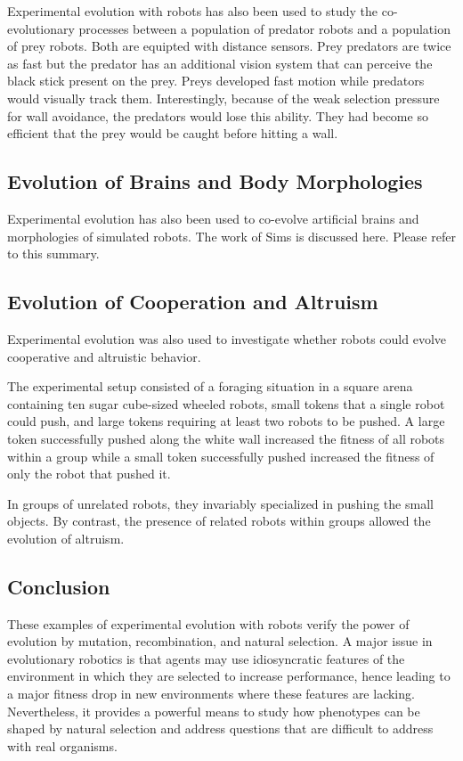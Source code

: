 \documentclass[../main.tex]{subfiles}
\begin{document}
\begin{experiment}
Experimental evolution with robots has also been used to study the co-evolutionary processes between a population of
predator robots and a population of prey robots. Both are equipted with distance sensors. Prey predators are twice as
fast but the predator has an additional vision system that can perceive the black stick present on the prey. Preys
developed fast motion while predators would visually track them. Interestingly, because of the weak selection pressure
for wall avoidance, the predators would lose this ability. They had become so efficient that the prey would be caught
before hitting a wall.
\end{experiment}

\subsection{Evolution of Brains and Body Morphologies}
Experimental evolution has also been used to co-evolve artificial brains and morphologies of simulated robots. The work of Sims \cite{Sims:1994:EMB:1667943.1667946} is discussed here. Please refer to this summary.

\subsection{Evolution of Cooperation and Altruism}
Experimental evolution was also used to investigate whether robots could evolve cooperative and altruistic behavior.

\begin{experiment}
The experimental setup consisted of a foraging situation in a square arena containing ten sugar cube-sized wheeled
robots, small tokens that a single robot could push, and large tokens requiring at least two robots to be pushed. A
large token successfully pushed along the white wall increased the fitness of all robots within a group while a small
token successfully pushed increased the fitness of only the robot that pushed it.

In groups of unrelated robots, they invariably specialized in pushing the small objects. By contrast, the presence of
related robots within groups allowed the evolution of altruism.
\end{experiment}

\subsection{Conclusion}
These examples of experimental evolution with robots verify the power of evolution by mutation, recombination, and
natural selection. A major issue in evolutionary robotics is that agents may use idiosyncratic features of the
environment in which they are selected to increase performance, hence leading to a major fitness drop in new
environments where these features are lacking. Nevertheless, it provides a powerful means to study how phenotypes can
be shaped by natural selection and address questions that are difficult to address with real organisms.
\end{document}
